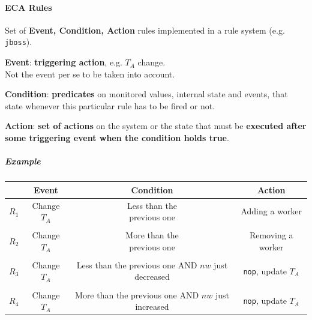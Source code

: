 \documentclass[10pt]{report}
\begin{document}
\paragraph{ECA Rules} Set of \textbf{Event, Condition, Action} rules implemented in a rule system (e.g. \texttt{jboss}).\begin{list}{}{}
	\item \textbf{Event}: \textbf{triggering action}, e.g. $T_A$ change.\\
	Not the event per se to be taken into account.
	\item \textbf{Condition}: \textbf{predicates} on monitored values, internal state and events, that state whenever this particular rule has to be fired or not.
	\item \textbf{Action}: \textbf{set of actions} on the system or the state that must be \textbf{executed after some triggering event when the condition holds true}.
\end{list}
\subparagraph{Example}
\begin{center}
	\begin{tabular}{c | c c c}
	& \textbf{Event} & \textbf{Condition} & \textbf{Action}\\
	\hline
	$R_1$ & Change $T_A$ & \makecell{Less than the\\previous one} & Adding a worker\\\\
	$R_2$ & Change $T_A$ & \makecell{More than the\\previous one} & Removing a worker\\\\
	$R_3$ & Change $T_A$ & \makecell{Less than the\\previous one AND\\$nw$ just decreased} & \texttt{nop}, update $T_A$\\\\
	$R_4$ & Change $T_A$ & \makecell{More than the\\previous one AND\\$nw$ just increased} & \texttt{nop}, update $T_A$
	\end{tabular}
\end{center}
\end{document}
